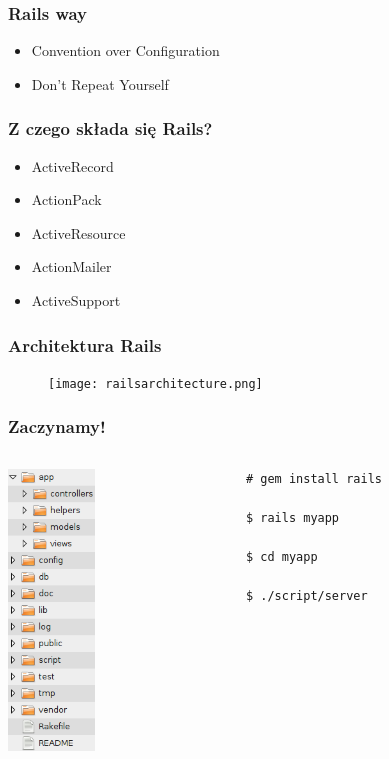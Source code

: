 \documentclass[12t]{beamer}
\begin{document}
\begin{frame}
  \frametitle{Rails way}
  \begin{itemize}
  \item Convention over Configuration
  \item Don't Repeat Yourself
  \end{itemize}
\end{frame}

\begin{frame}
  \frametitle{Z czego składa się Rails?}
  \begin{itemize}
  \item ActiveRecord
  \item ActionPack
  \item ActiveResource
  \item ActionMailer
  \item ActiveSupport
  \end{itemize}
\end{frame}

\begin{frame}
  \frametitle{Architektura Rails}
  \begin{figure}
    \centering
    \texttt{[image: railsarchitecture.png]}
  \end{figure}
\end{frame}

\begin{frame}[fragile]
  \frametitle{Zaczynamy!}
  \begin{columns}[T]
    \begin{column}{2.3cm}
      \includegraphics[width=2.3cm]{structure.png}
    \end{column}
    \begin{column}{7.5cm}
\begin{verbatim}
# gem install rails

$ rails myapp

$ cd myapp

$ ./script/server
\end{verbatim}
    \end{column}
  \end{columns}
\end{frame}
\end{document}

